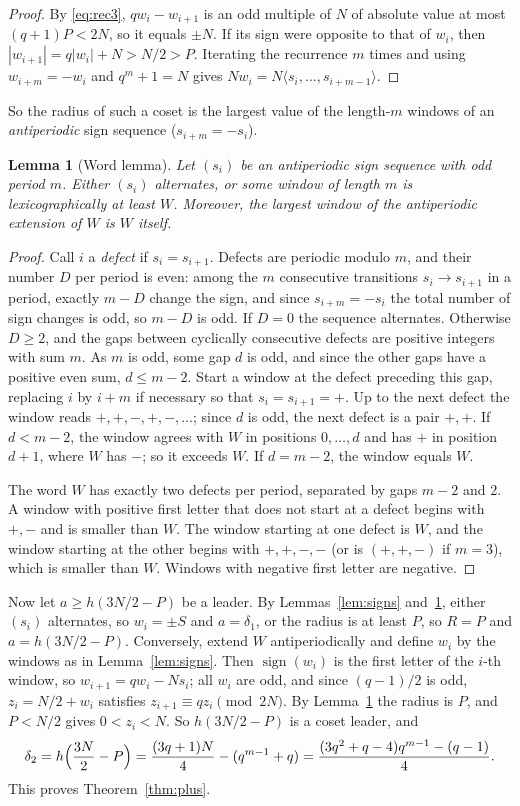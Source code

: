 \documentclass[11pt]{amsart}
\newtheorem{lemma}[theorem]{Lemma}
\theoremstyle{remark}
\begin{document}
\begin{proof}
By \eqref{eq:rec3}, $qw_i-w_{i+1}$ is an odd multiple of $N$ of absolute value at most $(q+1)P<2N$, so it equals $\pm N$.
If its sign were opposite to that of $w_i$, then $|w_{i+1}|=q|w_i|+N>N/2>P$.
Iterating the recurrence $m$ times and using $w_{i+m}=-w_i$ and $q^m+1=N$ gives $Nw_i=N\langle s_i,\dots,s_{i+m-1}\rangle$.
\end{proof}

So the radius of such a coset is the largest value of the length-$m$ windows of an \emph{antiperiodic} sign sequence ($s_{i+m}=-s_i$).

\begin{lemma}[Word lemma]\label{lem:word}
Let $(s_i)$ be an antiperiodic sign sequence with odd period $m$.
Either $(s_i)$ alternates, or some window of length $m$ is lexicographically at least $W$.
Moreover, the largest window of the antiperiodic extension of $W$ is $W$ itself.
\end{lemma}

\begin{proof}
Call $i$ a \emph{defect} if $s_i=s_{i+1}$.
Defects are periodic modulo $m$, and their number $D$ per period is even: among the $m$ consecutive transitions $s_i\to s_{i+1}$ in a period, exactly $m-D$ change the sign, and since $s_{i+m}=-s_i$ the total number of sign changes is odd, so $m-D$ is odd.
If $D=0$ the sequence alternates.
Otherwise $D\ge2$, and the gaps between cyclically consecutive defects are positive integers with sum $m$.
As $m$ is odd, some gap $d$ is odd, and since the other gaps have a positive even sum, $d\le m-2$.
Start a window at the defect preceding this gap, replacing $i$ by $i+m$ if necessary so that $s_i=s_{i+1}=+$.
Up to the next defect the window reads $+,+,-,+,-,\dots$; since $d$ is odd, the next defect is a pair $+,+$.
If $d<m-2$, the window agrees with $W$ in positions $0,\dots,d$ and has $+$ in position $d+1$, where $W$ has $-$; so it exceeds $W$.
If $d=m-2$, the window equals $W$.

The word $W$ has exactly two defects per period, separated by gaps $m-2$ and $2$.
A window with positive first letter that does not start at a defect begins with $+,-$ and is smaller than $W$.
The window starting at one defect is $W$, and the window starting at the other begins with $+,+,-,-$ (or is $(+,+,-)$ if $m=3$), which is smaller than $W$.
Windows with negative first letter are negative.
\end{proof}

Now let $a\ge h(3N/2-P)$ be a leader.
By Lemmas~\ref{lem:signs} and~\ref{lem:word}, either $(s_i)$ alternates, so $w_i=\pm S$ and $a=\delta_1$, or the radius is at least $P$, so $R=P$ and $a=h(3N/2-P)$.
Conversely, extend $W$ antiperiodically and define $w_i$ by the windows as in Lemma~\ref{lem:signs}.
Then $\operatorname{sign}(w_i)$ is the first letter of the $i$-th window, so $w_{i+1}=qw_i-Ns_i$; all $w_i$ are odd, and since $(q-1)/2$ is odd, $z_i=N/2+w_i$ satisfies $z_{i+1}\equiv qz_i\pmod{2N}$.
By Lemma~\ref{lem:word} the radius is $P$, and $P<N/2$ gives $0<z_i<N$.
So $h(3N/2-P)$ is a coset leader, and
\[
\delta_2=h\Bigl(\frac{3N}2-P\Bigr)=\frac{(3q+1)N}4-(q^{m-1}+q)=\frac{(3q^2+q-4)q^{m-1}-(q-1)}4 .
\]
This proves Theorem~\ref{thm:plus}.
\end{document}
